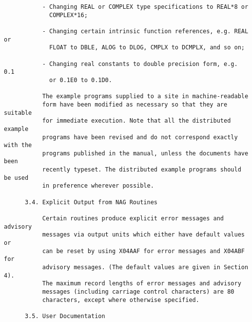 \begin{small}
\begin{verbatim}
           - Changing REAL or COMPLEX type specifications to REAL*8 or          
             COMPLEX*16;                                                        
                                                                                
           - Changing certain intrinsic function references, e.g. REAL or       
             FLOAT to DBLE, ALOG to DLOG, CMPLX to DCMPLX, and so on;           
                                                                                
           - Changing real constants to double precision form, e.g. 0.1         
             or 0.1E0 to 0.1D0.                                                 
                                                                                
           The example programs supplied to a site in machine-readable          
           form have been modified as necessary so that they are suitable       
           for immediate execution. Note that all the distributed example       
           programs have been revised and do not correspond exactly with the    
           programs published in the manual, unless the documents have been     
           recently typeset. The distributed example programs should be used    
           in preference wherever possible.                                     
                                                                                
      3.4. Explicit Output from NAG Routines                                    
                                                                                
           Certain routines produce explicit error messages and advisory        
           messages via output units which either have default values or        
           can be reset by using X04AAF for error messages and X04ABF for       
           advisory messages. (The default values are given in Section 4).      
           The maximum record lengths of error messages and advisory            
           messages (including carriage control characters) are 80              
           characters, except where otherwise specified.                        
                                                                                
      3.5. User Documentation                                                   
                                                                                

\end{verbatim}
\end{small}
